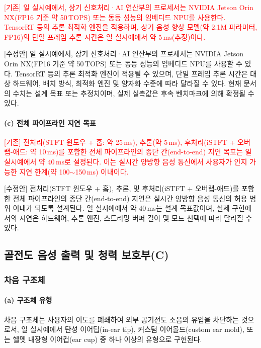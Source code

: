 \documentclass{article}
\newcommand{\reviewold}[1]{{\par\noindent\textcolor{red}{[기존] #1}}}
\newcommand{\reviewnew}[1]{{\par\noindent\textcolor{customblue}{[수정안] #1}}}
\newcommand{\reviewpair}[2]{\reviewold{#1}\reviewnew{#2}\par}
\begin{document}
\reviewpair{일 실시예에서, 상기 신호처리·AI 연산부의 프로세서는 NVIDIA Jetson Orin NX(FP16 기준 약 50\,TOPS) 또는 동등 성능의 임베디드 NPU를 사용한다. TensorRT 등의 추론 최적화 엔진을 적용하며, 상기 음성 향상 모델(약 2.1M 파라미터, FP16)의 단일 프레임 추론 시간은 일 실시예에서 약 5\,ms(추정)이다.}{일 실시예에서, 상기 신호처리·AI 연산부의 프로세서는 NVIDIA Jetson Orin NX(FP16 기준 약 50\,TOPS) 또는 동등 성능의 임베디드 NPU를 사용할 수 있다. TensorRT 등의 추론 최적화 엔진이 적용될 수 있으며, 단일 프레임 추론 시간은 대상 하드웨어, 배치 방식, 최적화 엔진 및 양자화 수준에 따라 달라질 수 있다. 현재 문서의 수치는 설계 목표 또는 추정치이며, 실제 실측값은 후속 벤치마크에 의해 확정될 수 있다.}

\paragraph{(c) 전체 파이프라인 지연 목표}

\reviewpair{전처리(STFT 윈도우 + 홉: 약 25\,ms), 추론(약 5\,ms), 후처리(iSTFT + 오버랩-애드: 약 10\,ms)를 포함한 전체 파이프라인의 종단 간(end-to-end) 지연 목표는 일 실시예에서 약 40\,ms로 설정된다. 이는 실시간 양방향 음성 통신에서 사용자가 인지 가능한 지연 한계(약 100$\sim$150\,ms) 이내이다.}{전처리(STFT 윈도우 + 홉), 추론, 및 후처리(iSTFT + 오버랩-애드)를 포함한 전체 파이프라인의 종단 간(end-to-end) 지연은 실시간 양방향 음성 통신의 허용 범위 이내가 되도록 설계된다. 일 실시예에서 약 40\,ms는 설계 목표값이며, 실제 구현에서의 지연은 하드웨어, 추론 엔진, 스트리밍 버퍼 길이 및 모드 선택에 따라 달라질 수 있다.}

\subsection{골전도 음성 출력 및 청력 보호부(C)}

\subsubsection{차음 구조체}

\paragraph{(a) 구조체 유형}

차음 구조체는 사용자의 이도를 폐쇄하여 외부 공기전도 소음의 유입을 차단하는 것으로서, 일 실시예에서 탄성 이어팁(in-ear tip), 커스텀 이어몰드(custom ear mold), 또는 헬멧 내장형 이어컵(ear cup) 중 하나 이상의 유형으로 구현된다.
\end{document}
